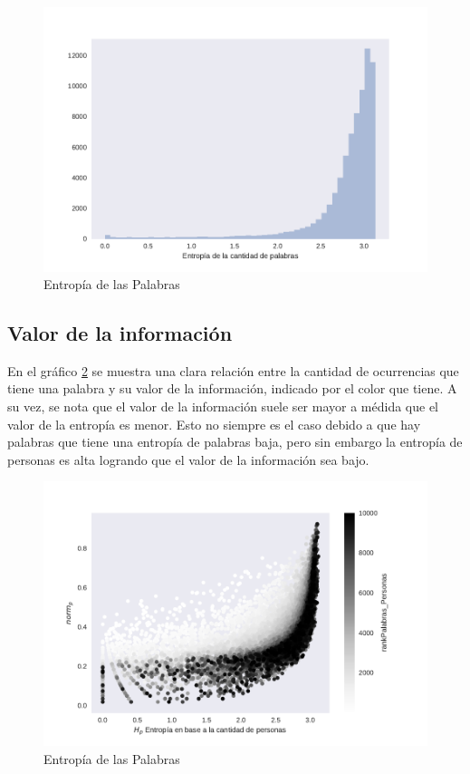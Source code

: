 \begin{figure}[ht]
\centering
\includegraphics[width=1.0\textwidth]{./images/DistribucionEntropia.pdf}
\caption{Entropía de las Palabras} 
\label{fig:entropiaPalabras} 
\end{figure}



\subsection{Valor de la información}
\label{sub:ValorDeLaInformacion}
En el gráfico \ref{fig:infoValue} se muestra una clara relación entre la cantidad de ocurrencias que tiene una palabra y su valor de la información, indicado por el color que tiene. A su vez, se nota que el valor de la información suele ser mayor a médida que el valor de la entropía es menor. Esto no siempre es el caso debido a que hay palabras que tiene una entropía de palabras baja, pero sin embargo la entropía de personas es alta logrando que el valor de la información sea bajo.

\begin{figure}[ht]
\centering
\includegraphics[width=1.0\textwidth]{./images/entropiaPersonasxNormCantPersonas.pdf}
\caption{Entropía de las Palabras} 
\label{fig:infoValue} 
\end{figure}

